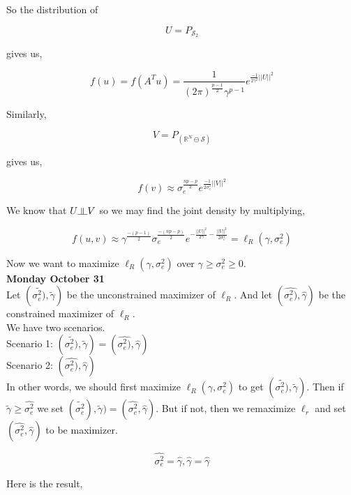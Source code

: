 \documentclass[11pt,fleqn]{book} %
\newcommand{\indep}{\rotatebox[origin=c]{90}{$\models$}}
\begin{document}
So the distribution of 

		$$ U = P_{\mathcal{S}_2} $$

gives us, 

		$$f(u) = f(A^Tu) = \frac{1}{(2\pi)^{\frac{p-1}{2}} \gamma^{p-1}} e^{\frac{-1}{2 \gamma^2} ||U||^2} $$

Similarly, 
	
	$$ V = P_{(\mathbb{R}^N \ominus \mathcal{S})} $$

gives us, 

		$$f(v) \approx  \sigma_e^{\frac{np- p}{2}} e^{\frac{-1}{2 \sigma_e^2} ||V||^2} $$


We know that $U \indep V$ so we may find the joint density by multiplying, 


		$$f(u, v) \approx \gamma^{\frac{-(p-1)}{2}} \sigma_e^{\frac{- (np - p)}{2}} e^{- \frac{||U||^2}{2 \gamma} - \frac{||V||^2}{2\sigma_e^2}} = \ell_R(\gamma, \sigma_e^2)$$


Now we want to maximize $\ell_R(\gamma, \sigma_e^2)$ over $\gamma \geq \sigma^2_e \geq 0$. \\

\textbf{Monday October 31}\\

Let $(\tilde{\sigma_e^2)}, \tilde{\gamma})$ be the unconstrained maximizer of $\ell_R$. And let $(\hat{\sigma_e^2)}, \hat{\gamma})$ be the constrained maximizer of $\ell_R$. \\

We have two scenarios. \\


Scenario 1: $(\tilde{\sigma_e^2)}, \tilde{\gamma}) = (\hat{\sigma_e^2)}, \hat{\gamma})$\\

Scenario 2: $(\hat{\sigma_e^2)}, \hat{\gamma})$ \\

In other words, we should first maximize $\ell_R(\gamma, \sigma_e^2)$ to get $(\tilde{\sigma_e^2)}, \tilde{\gamma})$. Then if $\tilde{\gamma} \geq \hat{\sigma_e^2}$ we set $(\tilde{\sigma_e^2}), \tilde{\gamma}) = (\hat{\sigma_e^2}, \hat{\gamma})$. But if not, then we remaximize $\ell_r$ and set $(\hat{\sigma_e^2}, \hat{\gamma})$ to be maximizer. 

		$$\hat{\sigma_e^2} = \hat{\gamma}, \hat{\gamma} = \hat{\gamma} $$

Here is the result, 
\end{document}
